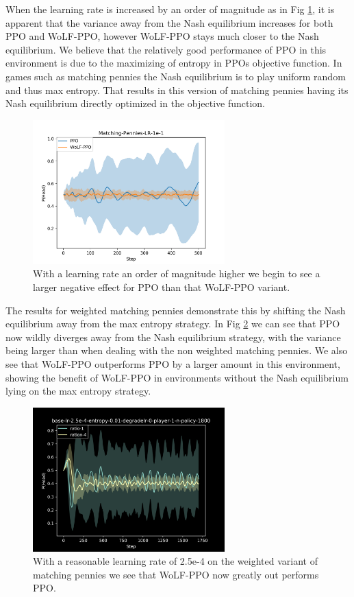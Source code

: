 \documentclass[conference]{IEEEtran}
\begin{document}
When the learning rate is increased by an order of magnitude as in Fig \ref{fig:mp-ppo-e1}, it is apparent that the variance away from the Nash equilibrium increases for both PPO and WoLF-PPO, however WoLF-PPO stays much closer to the Nash equilibrium. We believe that the relatively good performance of PPO in this environment is due to the maximizing of entropy in PPOs objective function. In games such as matching pennies the Nash equilibrium is to play uniform random and thus max entropy. That results in this version of matching pennies having its Nash equilibrium directly optimized in the objective function.

\begin{figure}
    \centering
    \includegraphics[width=20em]{Figures/matching-pennies-lr-1e-1.png}
    \caption{With a learning rate an order of magnitude higher we begin to see a larger negative effect for PPO than that WoLF-PPO variant.}
    \label{fig:mp-ppo-e1}
\end{figure}

The results for weighted matching pennies demonstrate this by shifting the Nash equilibrium away from the max entropy strategy. In Fig \ref{fig:weighted-mp-ppo-e4} we can see that PPO now wildly diverges away from the Nash equilibrium strategy, with the variance being larger than when dealing with the non weighted matching pennies. We also see that WoLF-PPO outperforms PPO by a larger amount in this environment, showing the benefit of WoLF-PPO in environments without the Nash equilibrium lying on the max entropy strategy.

\begin{figure}
    \centering
    \includegraphics[width=20em]{Figures/weighted-mp-ppo-e4.png}
    \caption{With a reasonable learning rate of 2.5e-4 on the weighted variant of matching pennies we see that WoLF-PPO now greatly out performs PPO.}
    \label{fig:weighted-mp-ppo-e4}
\end{figure}
\end{document}
